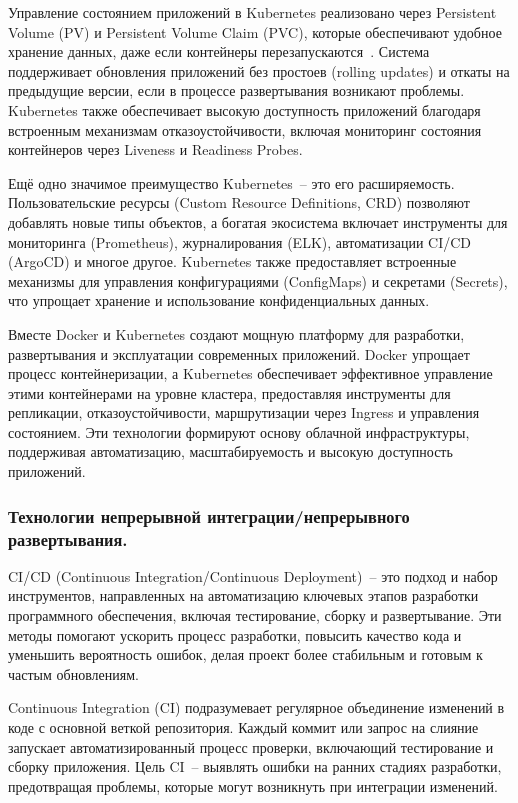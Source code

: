 Управление состоянием приложений в Kubernetes реализовано через Persistent Volume (PV) и Persistent Volume Claim (PVC), которые обеспечивают удобное хранение данных, даже если контейнеры перезапускаются~\cite{book_production_kubernetes}. Система поддерживает обновления приложений без простоев (rolling updates) и откаты на предыдущие версии, если в процессе развертывания возникают проблемы. Kubernetes также обеспечивает высокую доступность приложений благодаря встроенным механизмам отказоустойчивости, включая мониторинг состояния контейнеров через Liveness и Readiness Probes.

Ещё одно значимое преимущество Kubernetes~-- это его расширяемость. Пользовательские ресурсы (Custom Resource Definitions, CRD) позволяют добавлять новые типы объектов, а богатая экосистема включает инструменты для мониторинга (Prometheus), журналирования (ELK), автоматизации CI/CD (ArgoCD) и многое другое. Kubernetes также предоставляет встроенные механизмы для управления конфигурациями (ConfigMaps) и секретами (Secrets), что упрощает хранение и использование конфиденциальных данных.

Вместе Docker и Kubernetes создают мощную платформу для разработки, развертывания и эксплуатации современных приложений. Docker упрощает процесс контейнеризации, а Kubernetes обеспечивает эффективное управление этими контейнерами на уровне кластера, предоставляя инструменты для репликации, отказоустойчивости, маршрутизации через Ingress и управления состоянием. Эти технологии формируют основу облачной инфраструктуры, поддерживая автоматизацию, масштабируемость и высокую доступность приложений.

\subsubsection{Технологии непрерывной интеграции/непрерывного развертывания. }

CI/CD (Continuous Integration/Continuous Deployment)~-- это подход и набор инструментов, направленных на автоматизацию ключевых этапов разработки программного обеспечения, включая тестирование, сборку и развертывание. Эти методы помогают ускорить процесс разработки, повысить качество кода и уменьшить вероятность ошибок, делая проект более стабильным и готовым к частым обновлениям.

Continuous Integration (CI) подразумевает регулярное объединение изменений в коде с основной веткой репозитория. Каждый коммит или запрос на слияние запускает автоматизированный процесс проверки, включающий тестирование и сборку приложения. Цель CI~-- выявлять ошибки на ранних стадиях разработки, предотвращая проблемы, которые могут возникнуть при интеграции изменений.


